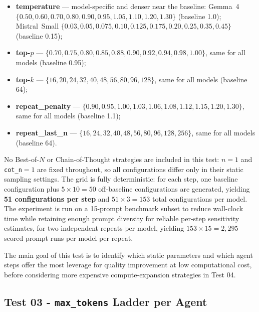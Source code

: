 \begin{itemize}
    \item \textbf{temperature} — model-specific and denser near the baseline:
          Gemma~4 $\{0.50,\allowbreak 0.60,\allowbreak 0.70,\allowbreak 0.80,\allowbreak
          0.90,\allowbreak 0.95,\allowbreak 1.05,\allowbreak 1.10,\allowbreak 1.20,\allowbreak
          1.30\}$ (baseline 1.0); Mistral~Small $\{0.03,\allowbreak 0.05,\allowbreak
          0.075,\allowbreak 0.10,\allowbreak 0.125,\allowbreak 0.175,\allowbreak 0.20,\allowbreak
          0.25,\allowbreak 0.35,\allowbreak 0.45\}$ (baseline 0.15);
    \item \textbf{top-$p$} — $\{0.70, 0.75, 0.80, 0.85, 0.88, 0.90, 0.92, 0.94,
          0.98, 1.00\}$, same for all models (baseline 0.95);
    \item \textbf{top-$k$} — $\{16, 20, 24, 32, 40, 48, 56, 80, 96, 128\}$,
          same for all models (baseline 64);
    \item \textbf{repeat\_penalty} — $\{0.90, 0.95, 1.00, 1.03, 1.06, 1.08,
          1.12, 1.15, 1.20, 1.30\}$, same for all models (baseline 1.1);
    \item \textbf{repeat\_last\_n} — $\{16, 24, 32, 40, 48, 56, 80, 96, 128,
          256\}$, same for all models (baseline 64).
\end{itemize}

No Best-of-$N$ or Chain-of-Thought strategies are included in this test: $n=1$
and \texttt{cot\_n}$=1$ are fixed throughout, so all configurations differ only
in their static sampling settings. The grid is fully deterministic: for each
step, one baseline configuration plus $5 \times 10 = 50$ off-baseline
configurations are generated, yielding \textbf{51 configurations per step} and
$51 \times 3 = 153$ total configurations per model. The experiment is run on a
15-prompt benchmark subset to reduce wall-clock time while retaining enough
prompt diversity for reliable per-step sensitivity estimates, for two
independent repeats per model, yielding $153 \times 15 = 2{,}295$ scored prompt
runs per model per repeat.

The main goal of this test is to identify which static parameters and which
agent steps offer the most leverage for quality improvement at low computational
cost, before considering more expensive compute-expansion strategies in Test 04.

\subsection{Test 03 - \texttt{max\_tokens} Ladder per Agent}
\label{subsec:test03}

